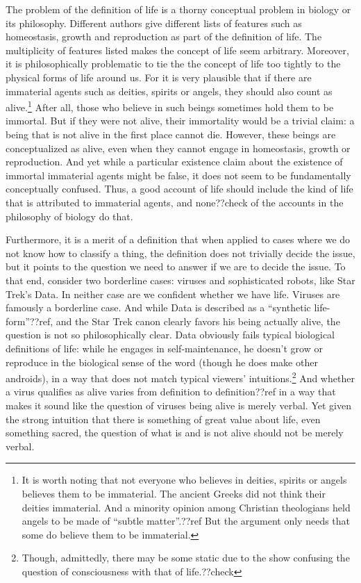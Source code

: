 The problem of the definition of life is a thorny conceptual problem in biology or its philosophy. Different authors give different lists of features such
as homeostasis, growth and reproduction as part of the definition of life. The multiplicity of features listed makes the concept of life seem arbitrary.
Moreover, it is philosophically problematic to tie the the concept of life too tightly to the physical forms of life around us. For it is very plausible
that if there are immaterial agents such as deities, spirits or angels, they should also count as alive.\footnote{It is worth noting that not everyone who
believes in deities, spirits or angels believes them to be immaterial. The ancient Greeks did not think their deities immaterial. And a minority opinion
among Christian theologians held angels to be made of ``subtle matter''.??ref But the argument only needs that some do believe them to be immaterial.}
 After all, those who believe in such beings sometimes
hold them to be immortal. But if they were not alive, their immortality would be a trivial claim: a being that is not alive in the first place cannot die.
However, these beings are conceptualized as alive, even when they cannot engage in homeostasis, growth or reproduction. And yet while a particular existence
claim about the existence of immortal immaterial agents might be false, it does not seem to be fundamentally conceptually confused. Thus, a good account
of life should include the kind of life that is attributed to immaterial agents, and none??check of the accounts in the philosophy of biology do that.

Furthermore, it is a merit of a definition that when applied to cases where we do not know how to classify a thing, the definition does not trivially
decide the issue, but it points to the question we need to answer if we are to decide the issue. To that end, consider two borderline cases: viruses
and sophisticated robots, like Star Trek's Data. In neither case are we confident whether we have life. Viruses are famously a borderline case.
And while Data is described as a ``synthetic life-form''??ref, and the Star Trek canon clearly favors his being actually alive, the question is
not so philosophically clear. Data obviously fails typical biological definitions of life: while he engages in self-maintenance, he doesn't grow or
reproduce in the biological sense of the word (though he does make other androids), in a way that does not match typical viewers' intuitions.\footnote{Though,
admittedly, there may be some static due to the show confusing the question of consciousness with that of life.??check} And
whether a virus qualifies as alive varies from definition
to definition??ref in a way that makes it sound like the question of viruses being alive is merely verbal. Yet given the strong intuition that there
is something of great value about life, even something sacred, the question of what is and is not alive should not be merely verbal.

